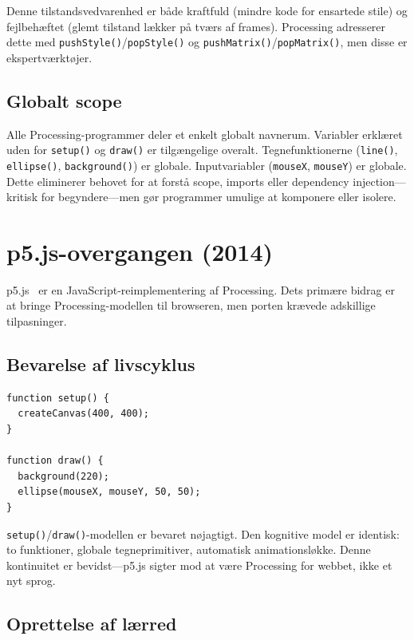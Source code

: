 \documentclass[10pt,letterpaper,twocolumn]{article}
\begin{document}
Denne tilstandsvedvarenhed er både kraftfuld (mindre kode for ensartede stile) og fejlbehæftet (glemt tilstand lækker på tværs af frames). Processing adresserer dette med \texttt{pushStyle()}/\texttt{popStyle()} og \texttt{pushMatrix()}/\texttt{popMatrix()}, men disse er ekspertværktøjer.

\subsection{Globalt scope}

Alle Processing-programmer deler et enkelt globalt navnerum. Variabler erklæret uden for \texttt{setup()} og \texttt{draw()} er tilgængelige overalt. Tegnefunktionerne (\texttt{line()}, \texttt{ellipse()}, \texttt{background()}) er globale. Inputvariabler (\texttt{mouseX}, \texttt{mouseY}) er globale. Dette eliminerer behovet for at forstå scope, imports eller dependency injection---kritisk for begyndere---men gør programmer umulige at komponere eller isolere.


\section{p5.js-overgangen (2014)}
\label{sec:p5js}

p5.js~\citep{mccarthy2015p5js} er en JavaScript-reimplementering af Processing. Dets primære bidrag er at bringe Processing-modellen til browseren, men porten krævede adskillige tilpasninger.

\subsection{Bevarelse af livscyklus}

\begin{lstlisting}[style=p5style,caption={Minimal p5.js-skitse.}]
function setup() {
  createCanvas(400, 400);
}

function draw() {
  background(220);
  ellipse(mouseX, mouseY, 50, 50);
}
\end{lstlisting}

\texttt{setup()}/\texttt{draw()}-modellen er bevaret nøjagtigt. Den kognitive model er identisk: to funktioner, globale tegneprimitiver, automatisk animationsløkke. Denne kontinuitet er bevidst---p5.js sigter mod at være Processing for webbet, ikke et nyt sprog.

\subsection{Oprettelse af lærred}
\end{document}
